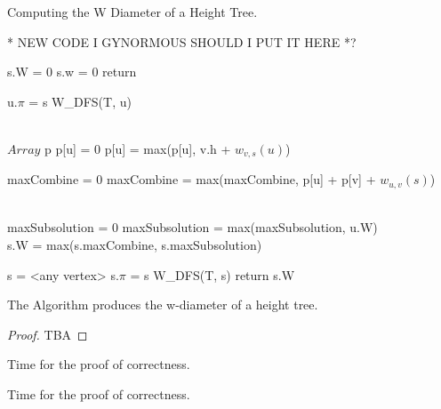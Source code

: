 \begin{algorithm}
\caption{Computing the W Diameter of a Height Tree.}


* NEW CODE I GYNORMOUS SHOULD I PUT IT HERE *?

\begin{algorithmic}[1]


        \State s.W = 0
        \State s.w = 0
        \State return
    \EndIf

            \State u.$\pi$ = s
            \State W\_DFS(T, u)
        \EndIf
    \EndFor

    \\
    \State $Array$ p
        \State p[u] = 0
            \State p[u] = max(p[u], v.h + $w_{v, s}(u)$) 
        \EndFor
    \EndFor

    \State maxCombine = 0
        \State maxCombine = max(maxCombine, p[u] + p[v] + $w_{u, v}(s)$)
        \EndFor
    \EndFor

    \\
    \State maxSubsolution = 0
        \State maxSubsolution = max(maxSubsolution, u.W)
    \EndFor
    \\
    \State s.W = max(s.maxCombine, s.maxSubsolution)

\EndFunction

    \State s = <any vertex>
    \State s.$\pi$ = s
    \State W\_DFS(T, s)
    \State return s.W
\EndFunction

\end{algorithmic}
\end{algorithm}

\begin{lem} The Algorithm produces the w-diameter of a height tree. \end{lem}


\begin{proof}
    TBA
\end{proof}

Time for the proof of correctness.

Time for the proof of correctness.


